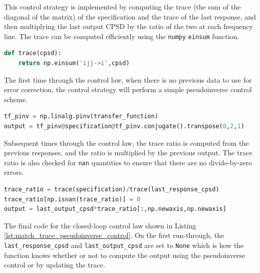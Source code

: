\documentclass[pdf,12pt,report]{SANDreport}
\newcommand{\inlineCode}{\lstinline[basicstyle=\bfseries\ttfamily]}
\begin{document}
    This control strategy is implemented by computing the trace (the sum of the diagonal of the matrix) of the specification and the trace of the last response, and then multiplying the last output \ac{CPSD} by the ratio of the two at each frequency line.  The trace can be computed efficiently using the \inlineCode{numpy} \inlineCode{einsum} function.
    
    \begin{lstlisting}[language=Python,caption={A short function to compute the trace of a \ac{CPSD} matrix in Python}]
def trace(cpsd):
    return np.einsum('ijj->i',cpsd)\end{lstlisting}
    
    The first time through the control law, when there is no previous data to use for error correction, the control strategy will perform a simple pseudoinverse control scheme.
    
    \begin{lstlisting}[language=Python]
tf_pinv = np.linalg.pinv(transfer_function)
output = tf_pinv@specification@tf_pinv.conjugate().transpose(0,2,1)\end{lstlisting}
    
    Subsequent times through the control law, the trace ratio is computed from the previous responses, and the ratio is multiplied by the previous output.  The trace ratio is also checked for \inlineCode{nan} quantities to ensure that there are no divide-by-zero errors.
    
    \begin{lstlisting}[language=Python]
trace_ratio = trace(specification)/trace(last_response_cpsd)
trace_ratio[np.isnan(trace_ratio)] = 0
output = last_output_cpsd*trace_ratio[:,np.newaxis,np.newaxis]\end{lstlisting}
    
    The final code for the closed-loop control law shown in Listing \ref{lst:match_trace_pseudoinverse_control}.  On the first run-through, the \inlineCode{last_response_cpsd} and \inlineCode{last_output_cpsd} are set to \inlineCode{None} which is how the function knows whether or not to compute the output using the pseudoinverse control or by updating the trace.
    
\end{document}
